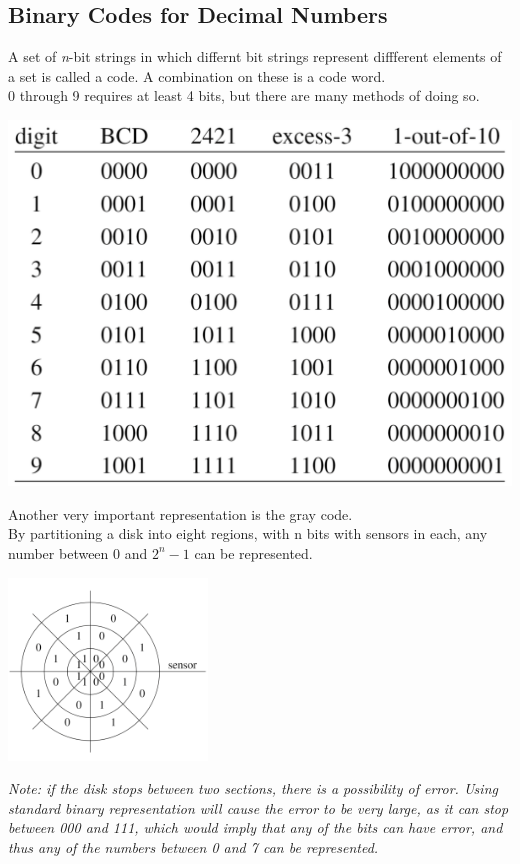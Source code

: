 \documentclass[nobib]{tufte-handout}
\begin{document}
\subsection{Binary Codes for Decimal Numbers}
A set of \textit{n}-bit strings in which differnt bit strings represent
diffferent elements of a set is called a code. A combination on these is a code
word.\\ 0 through 9 requires at least 4 bits, but there are many methods of
doing so.\\
\begin{center}
    \includegraphics[width = \textwidth]{images/decimal_codes.png}
\end{center}
Another very important representation is the gray code.\\
By partitioning a disk into eight regions, with n bits with sensors in each, any number between 0 and $2^n -1$ can be represented.\\
\begin{center}
    \includegraphics[width = 200px]{images/gray_code.png}
\end{center}
\textit{Note: if the disk stops between two sections, there is a possibility of error. Using standard binary representation will cause the error to be very large, as it can stop between 000 and 111, which would imply that any of the bits can have error, and thus any of the numbers between 0 and 7 can be represented.}
\end{document}
